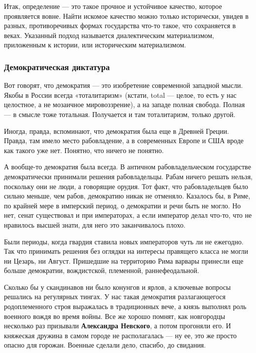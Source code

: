 Итак, определение — это такое прочное и устойчивое качество, которое
проявляется вовне. Найти искомое качество можно только исторически, увидев в
разных, противоречивых формах государства что-то такое, что сохраняется в
веках. Указанный подход называется диалектическим материализмом, приложенным к
истории, или историческим материализмом.

\subsubsection{Демократическая диктатура}


Вот говорят, что демократия — это изобретение современной западной мысли. Якобы
в России всегда «тоталитаризм» (кстати, total — целое, то есть у нас целостное,
а не мозаичное мировоззрение), а на западе полная свобода. Полная — в смысле
тоже тотальная. Получается и там тоталитаризм, только другой.

Иногда, правда, вспоминают, что демократия была еще в Древней Греции. Правда,
там имело место рабовладение, а в современных Европе и США вроде как такого уже
нет. Понятно, что ничего не понятно.

А вообще-то демократия была всегда. В античном рабовладельческом государстве
демократически принимали решения рабовладельцы. Рабам ничего решать нельзя,
поскольку они не люди, а говорящие орудия. Тот факт, что рабовладельцев было
сильно меньше, чем рабов, демократию никак не отменяло. Казалось бы, в Риме, по
крайней мере в имперский период, о демократии и речи быть не могло. Но нет,
сенат существовал и при императорах, а если император делал что-то, что не
нравилось высшей знати, для него это заканчивалось плохо.

Были периоды, когда гвардия ставила новых императоров чуть ли не ежегодно. Так
что принимать решения без оглядки на интересы правящего класса не могли ни
Цезарь, ни Август. Пришедшие на территорию Рима варвары принесли еще больше
демократии, вождистской, племенной, раннефеодальной.

Сколько бы у скандинавов ни было конунгов и ярлов, а ключевые вопросы решались
на регулярных тингах. У нас такая демократия разлагающегося родоплеменного
строя выражалась в традиционных вече, а князь выполнял роль военного вождя во
время войны. Все же хорошо помнят, как новгородцы несколько раз призывали
\textbf{Александра Невского}, а потом прогоняли его. И княжеская дружина в самом городе
не располагалась — ну ее, это же просто опасно для горожан. Военные сделали
дело, спасибо, до свидания.

